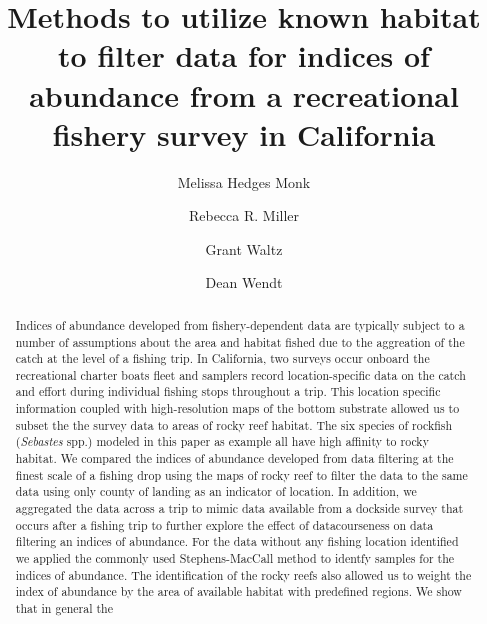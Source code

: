 \documentclass[
  12pt,
  authoryear,
  preprint,
  3p]{elsarticle}
\begin{document}
\begin{frontmatter}
\title{Methods to utilize known habitat to filter data for indices of
abundance from a recreational fishery survey in California}
\author[1]{Melissa Hedges Monk%
%
}
\author[2]{Rebecca R. Miller%
%
}
\author[33]{Grant Waltz%
%
}
\author[3]{Dean Wendt%
%
}








        
\begin{abstract}
Indices of abundance developed from fishery-dependent data are typically
subject to a number of assumptions about the area and habitat fished due
to the aggreation of the catch at the level of a fishing trip. In
California, two surveys occur onboard the recreational charter boats
fleet and samplers record location-specific data on the catch and effort
during individual fishing stops throughout a trip. This location
specific information coupled with high-resolution maps of the bottom
substrate allowed us to subset the the survey data to areas of rocky
reef habitat. The six species of rockfish (\emph{Sebastes} spp.) modeled
in this paper as example all have high affinity to rocky habitat. We
compared the indices of abundance developed from data filtering at the
finest scale of a fishing drop using the maps of rocky reef to filter
the data to the same data using only county of landing as an indicator
of location. In addition, we aggregated the data across a trip to mimic
data available from a dockside survey that occurs after a fishing trip
to further explore the effect of datacourseness on data filtering an
indices of abundance. For the data without any fishing location
identified we applied the commonly used Stephens-MacCall method to
identfy samples for the indices of abundance. The identification of the
rocky reefs also allowed us to weight the index of abundance by the area
of available habitat with predefined regions. We show that in general
the
\end{abstract}






\end{frontmatter}
\end{document}
